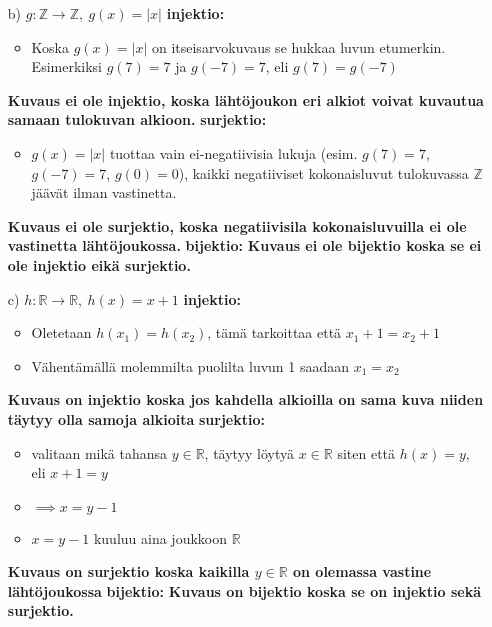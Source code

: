 \documentclass{article}
\begin{document}
\begin{itemize}
            \item[b)] $g : \mathbb{Z} \rightarrow \mathbb{Z}, \ g(x) = |x|$\newline
            \textbf{injektio:}
            \begin{itemize}
                \item Koska $g(x) = |x|$ on itseisarvokuvaus se hukkaa luvun etumerkin. Esimerkiksi $g(7) = 7$ ja $g(-7) = 7$, eli $g(7) = g(-7)$
            \end{itemize}
            \textbf{Kuvaus ei ole injektio, koska lähtöjoukon eri alkiot voivat kuvautua samaan tulokuvan alkioon.}\newline
            \textbf{surjektio:}
            \begin{itemize}
                \item $g(x) = |x|$ tuottaa vain ei-negatiivisia lukuja (esim. $g(7) = 7$, $g(-7) = 7$, $g(0) = 0$), kaikki negatiiviset kokonaisluvut tulokuvassa $\mathbb{Z}$ jäävät ilman vastinetta.
            \end{itemize}
            \textbf{Kuvaus ei ole surjektio, koska negatiivisila kokonaisluvuilla ei ole vastinetta lähtöjoukossa.}\newline
            \textbf{bijektio:}\newline
            \textbf{Kuvaus ei ole bijektio koska se ei ole injektio eikä surjektio.}
\pagebreak
            \item[c)] $h : \mathbb{R} \rightarrow \mathbb{R}, \ h(x) = x + 1$\newline
            \textbf{injektio:}
            \begin{itemize}
                \item Oletetaan $h(x_1) = h(x_2)$, tämä tarkoittaa että $x_1 + 1 = x_2 + 1$
                \item Vähentämällä molemmilta puolilta luvun 1 saadaan $x_1 = x_2$
            \end{itemize}
            \textbf{Kuvaus on injektio koska jos kahdella alkioilla on sama kuva niiden täytyy olla samoja alkioita}\newline
            \textbf{surjektio:}
            \begin{itemize}
                \item valitaan mikä tahansa $y \in \mathbb{R}$, täytyy löytyä $x \in \mathbb{R}$ siten että $h(x) = y$, eli $x + 1 = y$
                \item $\implies x = y - 1$
                \item $x = y - 1$ kuuluu aina joukkoon $\mathbb{R}$
            \end{itemize}
            \textbf{Kuvaus on surjektio koska kaikilla $y \in \mathbb{R}$ on olemassa vastine lähtöjoukossa}\newline
            \textbf{bijektio:}\newline
            \textbf{Kuvaus on bijektio koska se on injektio sekä surjektio.}
        \end{itemize}
    
\end{document}
